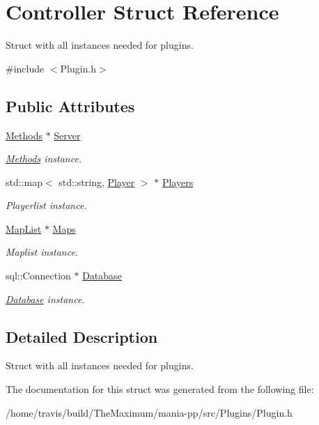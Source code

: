 \hypertarget{structController}{\section{Controller Struct Reference}
\label{structController}
}


Struct with all instances needed for plugins.  




{\ttfamily \#include $<$Plugin.\-h$>$}

\subsection*{Public Attributes}
\begin{DoxyCompactItemize}
\item 
\hypertarget{structController_a768e582ffa588191e09533071ad3a37f}{\hyperlink{classMethods}{Methods} $\ast$ \hyperlink{structController_a768e582ffa588191e09533071ad3a37f}{Server}}\label{structController_a768e582ffa588191e09533071ad3a37f}

\begin{DoxyCompactList}\small\item\em \hyperlink{classMethods}{Methods} instance. \end{DoxyCompactList}\item 
\hypertarget{structController_ad846e355170df1be5bec2c74cc63bc16}{std\-::map$<$ std\-::string, \hyperlink{structPlayer}{Player} $>$ $\ast$ \hyperlink{structController_ad846e355170df1be5bec2c74cc63bc16}{Players}}\label{structController_ad846e355170df1be5bec2c74cc63bc16}

\begin{DoxyCompactList}\small\item\em Playerlist instance. \end{DoxyCompactList}\item 
\hypertarget{structController_ab3ffbfa641bfee42c9440777f194bbb2}{\hyperlink{classMapList}{Map\-List} $\ast$ \hyperlink{structController_ab3ffbfa641bfee42c9440777f194bbb2}{Maps}}\label{structController_ab3ffbfa641bfee42c9440777f194bbb2}

\begin{DoxyCompactList}\small\item\em Maplist instance. \end{DoxyCompactList}\item 
\hypertarget{structController_a4dd102e10587534a986cd511544e93db}{sql\-::\-Connection $\ast$ \hyperlink{structController_a4dd102e10587534a986cd511544e93db}{Database}}\label{structController_a4dd102e10587534a986cd511544e93db}

\begin{DoxyCompactList}\small\item\em \hyperlink{classDatabase}{Database} instance. \end{DoxyCompactList}\end{DoxyCompactItemize}


\subsection{Detailed Description}
Struct with all instances needed for plugins. 

The documentation for this struct was generated from the following file\-:\begin{DoxyCompactItemize}
\item 
/home/travis/build/\-The\-Maximum/mania-\/pp/src/\-Plugins/Plugin.\-h\end{DoxyCompactItemize}
